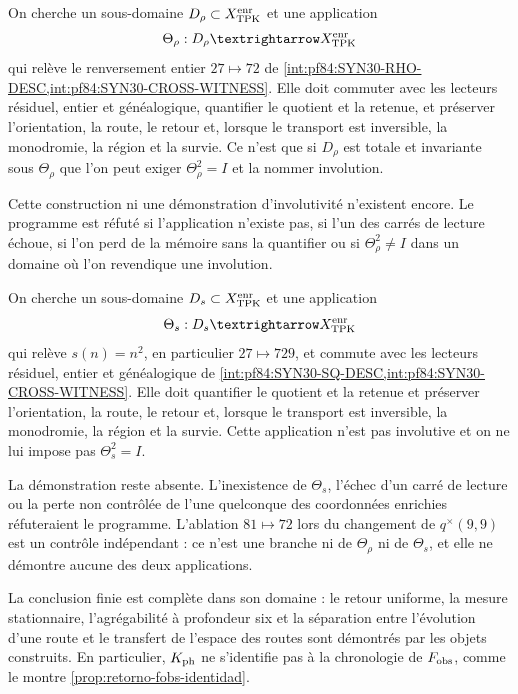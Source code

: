 \ifdefined\HMTInternalTraceability
\begin{criterion}
\label{pf84:SYN31-RHO-LIFT}
On cherche un sous-domaine \(D_\rho\subset X_{\rm TPK}^{\rm enr}\) et une application
\[
 \Theta_\rho:D_\rho\longrightarrow X_{\rm TPK}^{\rm enr}
\]
qui relève le renversement entier \(27\mapsto72\) de
\cref{int:pf84:SYN30-RHO-DESC,int:pf84:SYN30-CROSS-WITNESS}. Elle doit commuter avec les
lecteurs résiduel, entier et généalogique, quantifier le quotient et la
retenue, et préserver l'orientation, la route, le retour et, lorsque le transport est
inversible, la monodromie, la région et la survie.
Ce n'est que si \(D_\rho\) est totale et invariante sous \(\Theta_\rho\) que l'on peut exiger
\(\Theta_\rho^2=I\) et la nommer involution.

Cette construction ni une démonstration d'involutivité n'existent encore. Le
programme est réfuté si l'application n'existe pas, si l'un des carrés de
lecture échoue, si l'on perd de la mémoire sans la quantifier ou si
\(\Theta_\rho^2\ne I\) dans un domaine où l'on revendique une involution.
\end{criterion}

\begin{criterion}
\label{pf84:SYN31-SQ-LIFT}
On cherche un sous-domaine \(D_s\subset X_{\rm TPK}^{\rm enr}\) et une application
\[
 \Theta_s:D_s\longrightarrow X_{\rm TPK}^{\rm enr}
\]
qui relève \(s(n)=n^2\), en particulier \(27\mapsto729\), et commute avec les
lecteurs résiduel, entier et généalogique de
\cref{int:pf84:SYN30-SQ-DESC,int:pf84:SYN30-CROSS-WITNESS}. Elle doit quantifier le
quotient et la retenue et préserver l'orientation, la route, le retour et, lorsque le
transport est inversible, la monodromie, la région et la survie. Cette application n'est
pas involutive et on ne lui impose pas
\(\Theta_s^2=I\).

La démonstration reste absente. L'inexistence de \(\Theta_s\), l'échec
d'un carré de lecture ou la perte non contrôlée de l'une quelconque des
coordonnées enrichies réfuteraient le programme. L'ablation
\(81\mapsto72\) lors du changement de \(q^\times(9,9)\) est un contrôle indépendant :
ce n'est une branche ni de \(\Theta_\rho\) ni de \(\Theta_s\), et elle ne démontre aucune
des deux applications.
\end{criterion}
\fi

La conclusion finie est complète dans son domaine : le retour uniforme, la
mesure stationnaire, l'agrégabilité à profondeur six et la séparation
entre l'évolution d'une route et le transfert de l'espace des routes sont
démontrés par les objets construits. En particulier,
\(\widehat{\mathcal K}_{\rm ph}\) ne s'identifie pas à la chronologie de
\(F_{\rm obs}\), comme le montre \cref{prop:retorno-fobs-identidad}.
